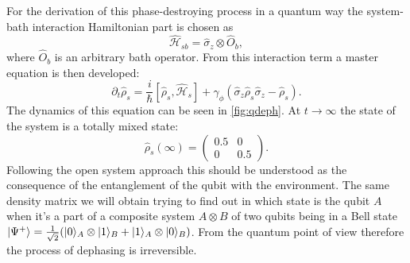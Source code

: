 \documentclass[12pt]{report}
\DeclarePairedDelimiter\ket{\lvert}{\rangle}
\newcommand{\rbrkt}[1]{\left( #1 \right)}
\numberwithin{equation}{section}
\begin{document}
For the derivation of this phase-destroying process in a quantum way the system-bath interaction Hamiltonian part is chosen as
\[
\mathcal{\hat H}_{sb} = \hat \sigma_z \otimes \hat O_b, 
\]
where $\hat O_b$ is an arbitrary bath operator. From this interaction term a master equation is then developed:
\[
\partial_t \hat \rho_s = \frac{i}{\hbar}[\hat \rho_s, \mathcal{\hat H}_s] + \gamma_\phi (\hat \sigma_z \hat \rho_s \hat \sigma_z - \hat \rho_s).
\]
The dynamics of this equation can be seen in \autoref{fig:qdeph}.  At $t \rightarrow \infty$ the state of the system is a totally mixed state:
\[
\hat \rho_s (\infty) = \rbrkt{\begin{matrix}
0.5 & 0 \\
0 & 0.5 
\end{matrix}}.
\]
Following the open system approach this should be understood as the consequence of the entanglement of the qubit with the environment. The same density matrix we will obtain trying to find out in which state
is the qubit $A$ when it's a part of a composite system $A \otimes B$ of two qubits being in a Bell  state $\ket{\Psi^+} = \frac{1}{\sqrt{2}}(\ket{0}_A\otimes\ket{1}_B+\ket{1}_A\otimes\ket{0}_B)$. From the quantum point of view therefore the process of dephasing is irreversible.
\end{document}

